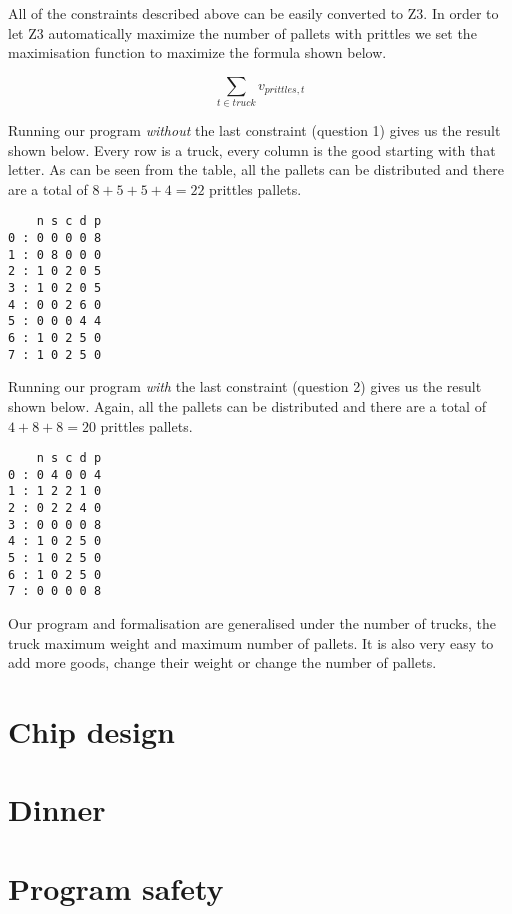 \documentclass[a4paper]{article}
\begin{document}
All of the constraints described above can be easily converted to Z3. In order
to let Z3 automatically maximize the number of pallets with prittles we set the
maximisation function to maximize the formula shown below.

\[ \sum_{t \in truck} v_{prittles,t} \]

Running our program \textit{without} the last constraint (question 1) gives us
the result shown below. Every row is a truck, every column is the good starting
with that letter. As can be seen from the table, all the pallets can be
distributed and there are a total of $8 + 5 + 5 + 4 = 22$ prittles pallets.
\begin{verbatim}
    n s c d p
0 : 0 0 0 0 8
1 : 0 8 0 0 0
2 : 1 0 2 0 5
3 : 1 0 2 0 5
4 : 0 0 2 6 0
5 : 0 0 0 4 4
6 : 1 0 2 5 0
7 : 1 0 2 5 0
\end{verbatim}

Running our program \textit{with} the last constraint (question 2) gives us the
result shown below. Again, all the pallets can be distributed and there are a
total of $4 + 8 + 8 = 20$ prittles pallets.

\begin{verbatim}
    n s c d p
0 : 0 4 0 0 4
1 : 1 2 2 1 0
2 : 0 2 2 4 0
3 : 0 0 0 0 8
4 : 1 0 2 5 0
5 : 1 0 2 5 0
6 : 1 0 2 5 0
7 : 0 0 0 0 8
\end{verbatim}

Our program and formalisation are generalised under the number of trucks, the
truck maximum weight and maximum number of pallets. It is also very easy to add
more goods, change their weight or change the number of pallets.

\section{Chip design}


\section{Dinner}


\section{Program safety}
\end{document}
